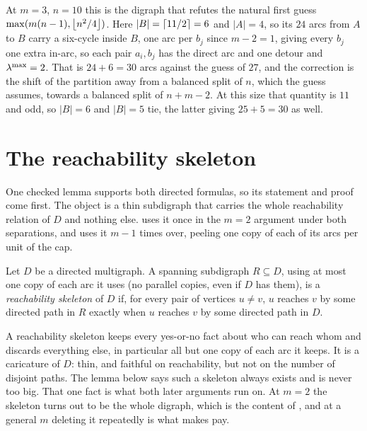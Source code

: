 At $m = 3$, $n = 10$ this is the digraph that refutes the natural first guess $\max(m(n-1), \left\lfloor n^2/4 \right\rfloor)$. Here $|B| = \left\lceil 11/2 \right\rceil = 6$ and $|A| = 4$, so its $24$ arcs from $A$ to $B$ carry a six-cycle inside $B$, one arc per $b_j$ since $m-2 = 1$, giving every $b_j$ one extra in-arc, so each pair $a_i, b_j$ has the direct arc and one detour and $\lambda^{\max} = 2$. That is $24 + 6 = 30$ arcs against the guess of $27$, and the correction is the shift of the partition away from a balanced split of $n$, which the guess assumes, towards a balanced split of $n + m - 2$. At this size that quantity is $11$ and odd, so $|B| = 6$ and $|B| = 5$ tie, the latter giving $25 + 5 = 30$ as well.

\section{The reachability skeleton}\label{sec:reach-skeleton}

One checked lemma supports both directed formulas, so its statement and proof come first. The object is a thin subdigraph that carries the whole
reachability relation of $D$ and nothing else.  uses it
once in the $m=2$ argument under both separations, and
 uses it $m-1$ times over, peeling one copy of each of its
arcs per unit of the cap.

\begin{definition}\label{def:reach-skeleton}
Let $D$ be a directed multigraph. A spanning subdigraph $R \subseteq D$, using at most one copy of each arc it uses (no parallel copies, even if $D$ has them), is a \emph{reachability skeleton} of $D$ if, for every pair of vertices $u \ne v$, $u$ reaches $v$ by some directed path in $R$ exactly when $u$ reaches $v$ by some directed path in $D$.
\end{definition}

A reachability skeleton keeps every yes-or-no fact about who can reach whom and discards everything else, in particular all but one copy of each arc it keeps. It is a caricature of $D$: thin, and faithful on reachability, but not on the number of disjoint paths. The lemma below says such a skeleton always exists and is never too big. That one fact is what both later arguments run on. At $m = 2$ the skeleton turns out to be the whole digraph, which is the content of , and at a general $m$ deleting it repeatedly is what  makes pay.

